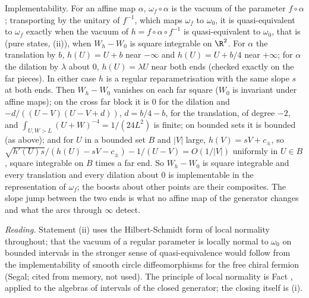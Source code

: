 Implementability. For an affine map $\alpha$, $\omega_{f}\circ\alpha$ is the vacuum of the parameter $f\circ\alpha$; transporting by the unitary of $f^{-1}$, which maps $\omega_{f}$ to $\omega_{0}$, it is quasi-equivalent to $\omega_{f}$ exactly when the vacuum of $h = f\circ\alpha\circ f^{-1}$ is quasi-equivalent to $\omega_{0}$, that is (pure states, (ii)), when $W_{h} - W_{0}$ is square integrable on $\R^{2}$. For $\alpha$ the translation by $b$, $h(U) = U + b$ near $-\infty$ and $h(U) = U + b/4$ near $+\infty$; for $\alpha$ the dilation by $\lambda$ about $0$, $h(U) = \lambda U$ near both ends (checked exactly on the far pieces). In either case $h$ is a regular reparametrisation with the same slope $s$ at both ends. Then $W_{h} - W_{0}$ vanishes on each far square ($W_{0}$ is invariant under affine maps); on the cross far block it is $0$ for the dilation and $-d/((U - V)(U - V + d))$, $d = b/4 - b$, for the translation, of degree $-2$, and $\int_{U, W > L}(U + W)^{-4} = 1/(24L^{2})$ is finite; on bounded sets it is bounded (as above); and for $U$ in a bounded set $B$ and $|V|$ large, $h(V) = sV + c_{\pm}$, so $\sqrt{h'(U)s}/(h(U) - sV - c_{\pm}) - 1/(U - V) = O(1/|V|)$ uniformly in $U \in B$, square integrable on $B$ times a far end. So $W_{h} - W_{0}$ is square integrable and every translation and every dilation about $0$ is implementable in the representation of $\omega_{f}$; the boosts about other points are their composites. The slope jump between the two ends is what no affine map of the generator changes and what the arcs through $\infty$ detect.

\emph{Reading.} Statement (ii) uses the Hilbert-Schmidt form of local normality throughout; that the vacuum of a regular parameter is locally normal to $\omega_{0}$ on bounded intervals in the stronger sense of quasi-equivalence would follow from the implementability of smooth circle diffeomorphisms for the free chiral fermion (Segal; cited from memory, not used). The principle of local normality is Fact , applied to the algebras of intervals of the closed generator; the closing itself is (i).
